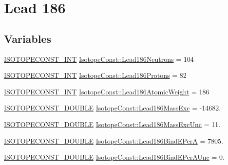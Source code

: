 \hypertarget{group___isotope_const-_lead-_pb186}{}\section{Lead 186}
\label{group___isotope_const-_lead-_pb186}
\subsection*{Variables}
\begin{DoxyCompactItemize}
\item 
\mbox{\hyperlink{group___isotope_const-_macros_ga5f18360b3e99483a35c32d789e62621c}{I\+S\+O\+T\+O\+P\+E\+C\+O\+N\+S\+T\+\_\+\+I\+NT}} \mbox{\hyperlink{group___isotope_const-_lead-_pb186_ga88e0df78d45342f359bb48ece3d88906}{Isotope\+Const\+::\+Lead186\+Neutrons}} = 104
\item 
\mbox{\hyperlink{group___isotope_const-_macros_ga5f18360b3e99483a35c32d789e62621c}{I\+S\+O\+T\+O\+P\+E\+C\+O\+N\+S\+T\+\_\+\+I\+NT}} \mbox{\hyperlink{group___isotope_const-_lead-_pb186_gaec2edf7b763a1c3769a98cda65cf0da3}{Isotope\+Const\+::\+Lead186\+Protons}} = 82
\item 
\mbox{\hyperlink{group___isotope_const-_macros_ga5f18360b3e99483a35c32d789e62621c}{I\+S\+O\+T\+O\+P\+E\+C\+O\+N\+S\+T\+\_\+\+I\+NT}} \mbox{\hyperlink{group___isotope_const-_lead-_pb186_ga22f8451ab6bfadcf61ba9a36a6514cba}{Isotope\+Const\+::\+Lead186\+Atomic\+Weight}} = 186
\item 
\mbox{\hyperlink{group___isotope_const-_macros_ga8f45a7272ce02c0b4c65c44636ed719a}{I\+S\+O\+T\+O\+P\+E\+C\+O\+N\+S\+T\+\_\+\+D\+O\+U\+B\+LE}} \mbox{\hyperlink{group___isotope_const-_lead-_pb186_gaede7c0663bc53b5773b7b25e131b7851}{Isotope\+Const\+::\+Lead186\+Mass\+Exc}} = -\/14682.
\item 
\mbox{\hyperlink{group___isotope_const-_macros_ga8f45a7272ce02c0b4c65c44636ed719a}{I\+S\+O\+T\+O\+P\+E\+C\+O\+N\+S\+T\+\_\+\+D\+O\+U\+B\+LE}} \mbox{\hyperlink{group___isotope_const-_lead-_pb186_ga61777ecb04a378d404c58cf33a168d91}{Isotope\+Const\+::\+Lead186\+Mass\+Exc\+Unc}} = 11.
\item 
\mbox{\hyperlink{group___isotope_const-_macros_ga8f45a7272ce02c0b4c65c44636ed719a}{I\+S\+O\+T\+O\+P\+E\+C\+O\+N\+S\+T\+\_\+\+D\+O\+U\+B\+LE}} \mbox{\hyperlink{group___isotope_const-_lead-_pb186_ga5454574a07e09805344907fec7e20aee}{Isotope\+Const\+::\+Lead186\+Bind\+E\+PerA}} = 7805.
\item 
\mbox{\hyperlink{group___isotope_const-_macros_ga8f45a7272ce02c0b4c65c44636ed719a}{I\+S\+O\+T\+O\+P\+E\+C\+O\+N\+S\+T\+\_\+\+D\+O\+U\+B\+LE}} \mbox{\hyperlink{group___isotope_const-_lead-_pb186_ga451124b978c30806e315cf88dde24d9f}{Isotope\+Const\+::\+Lead186\+Bind\+E\+Per\+A\+Unc}} = 0.

\end{DoxyCompactItemize}

